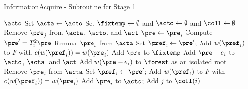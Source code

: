  
\begin{algorithm}
\caption{InformationAcquire - Subroutine for Stage 1}     
\label{infac}
\begin{algorithmic}[1]
\REQUIRE $\acto$
    \STATE Set $\acta \leftarrow \acto$ \label{alg1:add1}
    \STATE Set $\fixtemp \leftarrow \emptyset$ and $\actc \leftarrow \emptyset$ and $\coll \leftarrow \emptyset$
     \label{alg1:for1} 
            \STATE Remove $\pre_j$ from $\acta$, $\acto$, and $\act$ \label{alg1:stop0} \label{alg1:redundant}
        \ENDIF
    \ENDFOR
    \WHILE{$\acta \not = \emptyset$} \label{alg1:while1}
         \label{alg1:for2}
        \STATE $\pre \leftarrow \pre_i$
                \STATE Compute $\pre' = T_i^2 \pre$
                    \STATE Remove $\pre_i$ from $\acta$ \label{alg1:stop1}
                    \STATE Set $\pref_i \leftarrow \pre'$; Add $w(\pref_i)$ to $F$ with $c(w(\pref_i)) = w(\pre_i)$ \label{alg1:tree1}
                        \STATE Add $\pre$ to $\fixtemp$
                             \label{alg1:redundant}
                                \STATE Add $\pre - e_i$ to $\acto$, $\acta$, and $\act$ \label{alg1:addq}
                                \STATE Add $w(\pre - e_i)$ to $\forest$ as an isolated root 
                            \ENDIF
                        \ENDFOR
                    \ENDIF
                \ELSE
                         \label{alg1:impact}
                            \STATE Remove $\pre_i$ from $\acta$ \label{alg1:stop2}
                            \STATE Set $\pref_i \leftarrow \pre'$; Add $w(\pref_i)$ to $F$ with $c(w(\pref_i)) = w(\pre_i)$  \label{alg1:tree2}
                            \STATE Add $\pre_i$ to $\actc$; Add $j$ to $\coll(i)$  \label{alg1:coll}
                        \ENDIF
                    \ENDFOR
                \ENDWHILE
            \ENDIF
        \ENDFOR
    \ENDWHILE
    \RETURN{$(\actc, \coll, \fixtemp)$} 
\end{algorithmic}
\end{algorithm}


